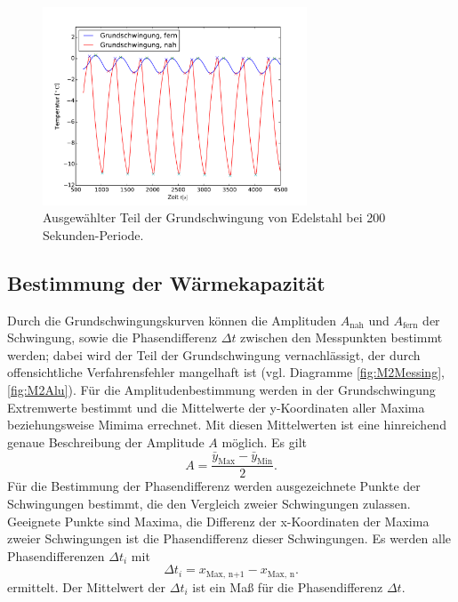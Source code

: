 \begin{figure}[h!]
	\centering
	\includegraphics[width=0.7\textwidth]{Bilder/M3_Edelstahl_norm.pdf}
	\caption{Ausgewählter Teil der Grundschwingung von Edelstahl bei 200 Sekunden-Periode.}
	\label{fig:M3EdelstahlNormkurve}
\end{figure}
\subsection{Bestimmung der Wärmekapazität}
\label{sub:waermekapazitaet}
Durch die Grundschwingungskurven können die Amplituden $A_{\text{nah}}$ und $A_{\text{fern}}$ der Schwingung, sowie die Phasendifferenz $\Delta t$ zwischen den Messpunkten bestimmt werden; 
dabei wird der Teil der Grundschwingung vernachlässigt, der durch offensichtliche Verfahrensfehler mangelhaft ist
(vgl. Diagramme \ref{fig:M2Messing}, \ref{fig:M2Alu}).
Für die Amplitudenbestimmung werden in der Grundschwingung Extremwerte bestimmt und die Mittelwerte der y-Koordinaten aller Maxima beziehungsweise Mimima errechnet.
Mit diesen Mittelwerten ist eine hinreichend genaue Beschreibung der Amplitude $A$ möglich.
Es gilt
\begin{equation}
	A = \frac{\bar{y}_{\text{Max}}-\bar{y}_{\text{Min}}}{2}.
\end{equation}
Für die Bestimmung der Phasendifferenz werden ausgezeichnete Punkte der Schwingungen bestimmt, die den Vergleich zweier Schwingungen zulassen. 
Geeignete Punkte sind Maxima, die Differenz der x-Koordinaten der Maxima zweier Schwingungen ist die Phasendifferenz dieser Schwingungen.
Es werden alle Phasendifferenzen $\Delta{t_i}$ mit
\begin{equation}
	\Delta{t_i} = {x}_{\text{Max, n+1}}-{x}_{\text{Max, n}}.
\end{equation}
ermittelt.
Der Mittelwert der $\Delta{t_i}$ ist ein Maß für die Phasendifferenz $\Delta{t}$.

